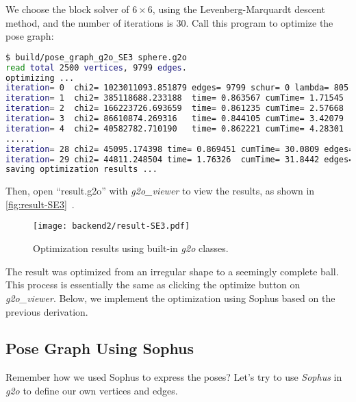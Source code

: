 We choose the block solver of $6\times6$, using the Levenberg-Marquardt descent method, and the number of iterations is 30. Call this program to optimize the pose graph:
\begin{lstlisting}[language=sh, caption=Terminal input:]
$ build/pose_graph_g2o_SE3 sphere.g2o 
read total 2500 vertices, 9799 edges.
optimizing ...
iteration= 0  chi2= 1023011093.851879 edges= 9799 schur= 0 lambda= 805.622433 levenbergIter= 1
iteration= 1  chi2= 385118688.233188  time= 0.863567 cumTime= 1.71545  edges= 9799 schur= 0 lambda= 537.081622 levenbergIter= 1
iteration= 2  chi2= 166223726.693659  time= 0.861235 cumTime= 2.57668  edges= 9799 schur= 0 lambda= 358.054415 levenbergIter= 1
iteration= 3  chi2= 86610874.269316   time= 0.844105 cumTime= 3.42079  edges= 9799 schur= 0 lambda= 238.702943 levenbergIter= 1
iteration= 4  chi2= 40582782.710190   time= 0.862221 cumTime= 4.28301  edges= 9799 schur= 0 lambda= 159.135295 levenbergIter= 1
......
iteration= 28 chi2= 45095.174398 time= 0.869451 cumTime= 30.0809 edges= 9799 schur= 0 lambda= 0.003127 levenbergIter= 1
iteration= 29 chi2= 44811.248504 time= 1.76326  cumTime= 31.8442 edges= 9799 schur= 0 lambda= 0.003785 levenbergIter= 2
saving optimization results ...
\end{lstlisting}

Then, open ``result.g2o'' with \textit{g2o\_viewer} to view the results, as shown in \autoref{fig:result-SE3}~.
\begin{figure}[!ht]
	\centering
	\texttt{[image: backend2/result-SE3.pdf]}
	\caption{Optimization results using built-in \textit{g2o} classes.}
	\label{fig:result-SE3}
\end{figure}

The result was optimized from an irregular shape to a seemingly complete ball. This process is essentially the same as clicking the optimize button on \textit{g2o\_viewer}. Below, we implement the optimization using Sophus based on the previous derivation.

\subsection{Pose Graph Using Sophus}
Remember how we used Sophus to express the poses? Let's try to use \textit{Sophus} in \textit{g2o} to define our own vertices and edges.

